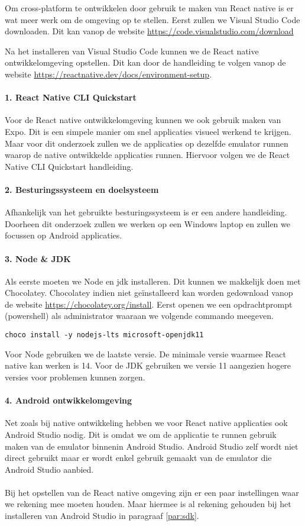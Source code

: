 Om cross-platform te ontwikkelen door gebruik te maken van React native is er wat meer werk om 
de omgeving op te stellen. Eerst zullen we Visual Studio Code downloaden. 
Dit kan vanop de website \url{https://code.visualstudio.com/download} 

Na het installeren van Visual Studio Code kunnen we de React native ontwikkelomgeving opstellen. 
Dit kan door de handleiding te volgen vanop de website \url{https://reactnative.dev/docs/environment-setup}.

\paragraph{1. React Native CLI Quickstart}
Voor de React native ontwikkelomgeving kunnen we ook gebruik maken van Expo. 
Dit is een simpele manier om snel applicaties visueel werkend te krijgen. 
Maar voor dit onderzoek zullen we de applicaties op dezelfde emulator runnen waarop de native 
ontwikkelde applicaties runnen. Hiervoor volgen we de React Native CLI Quickstart handleiding. 

\paragraph{2. Besturingssysteem en doelsysteem}
Afhankelijk van het gebruikte besturingssysteem is er een andere handleiding. 
Doorheen dit onderzoek zullen we werken op een Windows laptop en zullen we focussen op Android applicaties.

\paragraph{3. Node \& JDK}
Als eerste moeten we \Gls{Node} en \acrshort{jdk} installeren. Dit kunnen we makkelijk 
doen met \Gls{Chocolatey}. Chocolatey indien niet geïnstalleerd kan worden gedownload 
vanop de website \url{https://chocolatey.org/install}. Eerst openen we een 
opdrachtprompt (powershell) als administrator waaraan we volgende commando meegeven.
\begin{verbatim}
choco install -y nodejs-lts microsoft-openjdk11
\end{verbatim}
Voor Node gebruiken we de laatste versie. De minimale versie waarmee React native kan werken is 14. 
Voor de JDK gebruiken we versie 11 aangezien hogere versies voor problemen kunnen zorgen.

\paragraph{4. Android ontwikkelomgeving}
Net zoals bij native ontwikkeling hebben we voor React native applicaties ook Android Studio nodig. 
Dit is omdat we om de applicatie te runnen gebruik maken van de emulator binnenin Android Studio. 
Android Studio zelf wordt niet direct gebruikt maar er wordt enkel gebruik gemaakt van de 
emulator die Android Studio aanbied.
\\\\
Bij het opstellen van de React native omgeving zijn er een paar instellingen waar we rekening 
mee moeten houden. Maar hiermee is al rekening gehouden bij het installeren van Android Studio 
in paragraaf \ref{par:sdk}.

